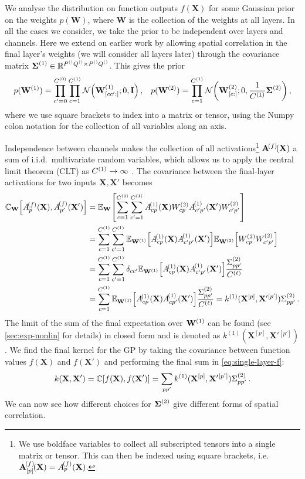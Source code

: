 \documentclass[tablecaption=bottom,wcp,nonatbib]{jmlr} %
\newcommand{\vX}{\mathbf{X}}
\newcommand{\vW}{\mathbf{W}}
\newcommand{\eye}{\mathbf{I}}
\begin{document}
We analyse the distribution on function outputs $f(\vX)$ for some Gaussian prior on the weights $p(\vW)$, where $\vW$ is the collection of the weights at all layers. In all the cases we consider, we take the prior to be independent over layers and channels. Here we extend on earlier work by allowing spatial correlation in the final layer's weights (we will consider all layers later) through the covariance matrix $\boldsymbol{\Sigma}^{(1)} \in \mathbb{R}^{P^{()}Q^{()}\times P^{()}Q^{()}}$. This gives the prior
\begin{align}
    p(\layerW1) = \prod_{c'=0}^{\layerC0}\prod_{c=1}^{\layerC1}\NormDist{\layerW1_{[cc':]}; 0, \eye} \,,
    && p(\layerW2) = \prod_{c=1}^{\layerC1} \NormDist{\layerW2_{[c:]}; 0, \frac{1}{\layerC1}\priorWcov2} \,,
\end{align}
where we use square brackets to index into a matrix or tensor, using the Numpy colon notation for the collection of all variables along an axis.

Independence between channels makes the collection of all activations\footnote{We use boldface variables to collect all subscripted tensors into a single matrix or tensor. This can then be indexed using square brackets, i.e.~$\layerNLA{(f)}{[p]} = \layerNLAs{(f)}{p}$.} $\layerNLA{(f)}{}$ a sum of i.i.d.~multivariate random variables, which allows us to apply the central limit theorem (CLT) as $C^{(1)}\to\infty$ \citep{neal1996bayesian}. The covariance between the final-layer activations for two inputs $\vX,\vX'$ becomes
\begin{align}
    \mathbb{C}_{\vW}\left[\layerNLAs{(f)}{p},\layerNLAsd{(f)}{p'}\right] &= \Exp{\vW}{\sum_{c=1}^{\layerC1}\sum_{c'=1}^{\layerC1} \layerNLAs{(1)}{cp}\layerWs{2}_{cp}\layerNLAsd{(1)}{c'p'}\layerWs{2}_{c'p'}} \nonumber \\
    &= \sum_{c=1}^{\layerC1}\sum_{c'=1}^{\layerC1} \Exp{\layerW1}{\layerNLAs{(1)}{cp}\layerNLAsd{(1)}{c'p'}}\Exp{\layerW2}{\layerWs{2}_{cp} \layerWs{2}_{c'p'}} \nonumber \\
    &= \sum_{c=1}^{\layerC1}\sum_{c'=1}^{\layerC1} \delta_{cc'} \Exp{\layerW1}{\layerNLAs{(1)}{cp}\layerNLAsd{(1)}{c'p'}}\frac{\priorWcovs{2}_{pp'}}{\layerC{\ell}} \nonumber \\
    &= \sum_{c=1}^{\layerC1} \Exp{\layerW1}{\layerNLAs{(1)}{cp}\layerNLAsd{(1)}{cp'}} \frac{\priorWcovs{2}_{pp'}}{\layerC{\ell}} = k^{(1)}(\vX^{[p]}, {\vX'}{}^{[p']}) \priorWcovs{2}_{pp'} \,.
\end{align}
The limit of the sum of the final expectation over $\layerW1$ can be found (see \cref{sec:exp-nonlin} for details) in closed form and is denoted as $k^{(1)}(\vX^{[p]}, {\vX'}{}^{[p']})$.
We find the final kernel for the GP by taking the covariance between function values $f(\vX)$ and $f(\vX')$ and performing the final sum in \cref{eq:single-layer-f}:
\begin{align}
    k(\vX, \vX') = \mathbb{C}\left[f(\vX), f(\vX')\right] = \sum_{pp'} k^{(1)}(\vX^{[p]}, {\vX'}{}^{[p']}) \priorWcovs{2}_{pp'} \label{eq:cov-kernel} \,.
\end{align}
We can now see how different choices for $\boldsymbol{\Sigma}^{(2)}$ give different forms of spatial correlation.
\end{document}
